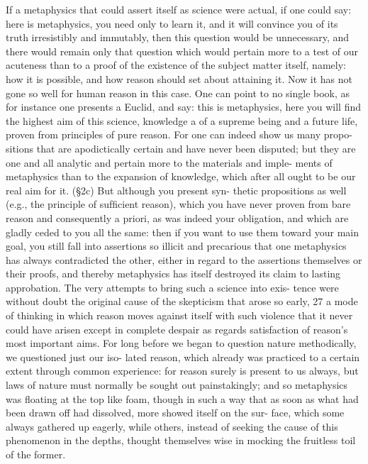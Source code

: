 If a metaphysics that could assert itself as science were actual, if one could
say: here is metaphysics, you need only to learn it, and it will convince
you of its truth irresistibly and immutably, then this question would be
unnecessary, and there would remain only that question which would
pertain more to a test of our acuteness than to a proof of the existence of
the subject matter itself, namely: how it is possible, and how reason should
set about attaining it. Now it has not gone so well for human reason in
this case. One can point to no single book, as for instance one presents
a Euclid, and say: this is metaphysics, here you will ﬁnd the highest aim
of this science, knowledge a of a supreme being and a future life, proven
from principles of pure reason. For one can indeed show us many propo-
sitions that are apodictically certain and have never been disputed; but
they are one and all analytic and pertain more to the materials and imple-
ments of metaphysics than to the expansion of knowledge, which after
all ought to be our real aim for it. (§2c) But although you present syn-
thetic propositions as well (e.g., the principle of sufﬁcient reason), which
you have never proven from bare reason and consequently a priori, as
was indeed your obligation, and which are gladly ceded to you all the
same: then if you want to use them toward your main goal, you still fall
into assertions so illicit and precarious that one metaphysics has always
contradicted the other, either in regard to the assertions themselves or
their proofs, and thereby metaphysics has itself destroyed its claim to
lasting approbation. The very attempts to bring such a science into exis-
tence were without doubt the original cause of the skepticism that arose
so early, 27 a mode of thinking in which reason moves against itself with
such violence that it never could have arisen except in complete despair
as regards satisfaction of reason’s most important aims. For long before
we began to question nature methodically, we questioned just our iso-
lated reason, which already was practiced to a certain extent through
common experience: for reason surely is present to us always, but laws
of nature must normally be sought out painstakingly; and so metaphysics
was ﬂoating at the top like foam, though in such a way that as soon as
what had been drawn off had dissolved, more showed itself on the sur-
face, which some always gathered up eagerly, while others, instead of
seeking the cause of this phenomenon in the depths, thought themselves
wise in mocking the fruitless toil of the former.

